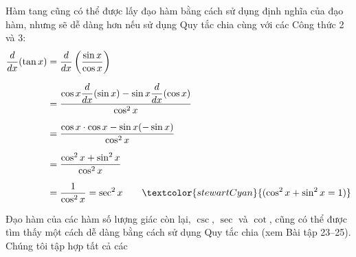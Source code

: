 \vspace{12pt}

\noindent\hspace*{152pt}%
\begin{minipage}{380pt}
  Hàm tang cũng có thể được lấy đạo hàm bằng cách sử dụng định nghĩa của đạo hàm, nhưng sẽ dễ dàng hơn nếu sử dụng Quy tắc chia cùng với các Công thức 2 và 3:
  \begin{align*}
  \frac{d}{dx}(\tan x) &= \frac{d}{dx}\left(\frac{\sin x}{\cos x}\right) \\[6pt]
  &= \frac{\cos x \dfrac{d}{dx}(\sin x) - \sin x \dfrac{d}{dx}(\cos x)}{\cos^2 x} \\[6pt]
  &= \frac{\cos x \cdot \cos x - \sin x (-\sin x)}{\cos^2 x} \\[6pt]
  &= \frac{\cos^2 x + \sin^2 x}{\cos^2 x} \\[6pt]
  &= \frac{1}{\cos^2 x} = \sec^2 x \qquad \textcolor{stewartCyan}{(\cos^2 x + \sin^2 x = 1)}
  \end{align*}
  \par\vspace{8pt}
  Đạo hàm của các hàm số lượng giác còn lại, $\csc$, $\sec$ và $\cot$, cũng có thể được tìm thấy một cách dễ dàng bằng cách sử dụng Quy tắc chia (xem Bài tập 23--25). Chúng tôi tập hợp tất cả các
\end{minipage}
